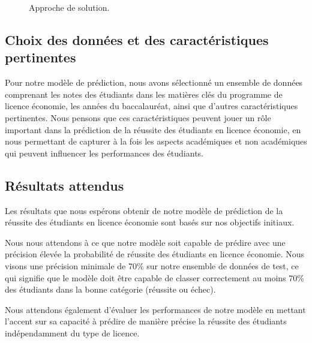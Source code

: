 \begin{figure}[H]%
    \center%
    \setlength{\fboxsep}{5pt}%
    \setlength{\fboxrule}{0.5pt}%
    \caption{Approche de solution.}%
\end{figure}

\subsection{Choix des données et des caractéristiques pertinentes}
Pour notre modèle de prédiction, nous avons sélectionné un ensemble de données comprenant les notes des étudiants dans les matières clés du programme de licence économie, les années du baccalauréat, ainsi que d'autres caractéristiques pertinentes. Nous pensons que ces caractéristiques peuvent jouer un rôle important dans la prédiction de la réussite des étudiants en licence économie, en nous permettant de capturer à la fois les aspects académiques et non académiques qui peuvent influencer les performances des étudiants.

\subsection{Résultats attendus}
Les résultats que nous espérons obtenir de notre modèle de prédiction de la réussite des étudiants en licence économie sont basés sur nos objectifs initiaux.

Nous nous attendons à ce que notre modèle soit capable de prédire avec une précision élevée la probabilité de réussite des étudiants en licence économie. Nous visons une précision minimale de 70\% sur notre ensemble de données de test, ce qui signifie que le modèle doit être capable de classer correctement au moins 70\% des étudiants dans la bonne catégorie (réussite ou échec).

Nous attendons également d'évaluer les performances de notre modèle en mettant l'accent sur sa capacité à prédire de manière précise la réussite des étudiants indépendamment du type de licence.

